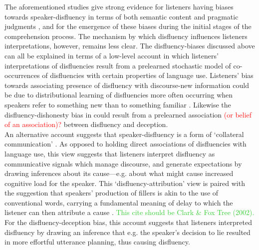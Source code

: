 \documentclass[man]{apa6}
\newcommand\thenote[1]{\textcolor{LimeGreen}{#1}}
\begin{document}
The aforementioned studies give strong evidence for listeners having biases towards speaker-disfluency in terms of both semantic content \citep{Arnold2004, Barr2001} and pragmatic judgments \citep{Loy2016}, and for the emergence of these biases during the initial stages of the comprehension process.
The mechanism by which disfluency influences listeners interpretations, however, remains less clear. 
The disfluency-biases discussed above can all be explained in terms of a low-level account in which listeners' interpretations of disfluencies result from a prelearned stochastic model of co-occurrences of disfluencies with certain properties of language use. 
Listeners' bias towards associating presence of disfluency with discourse-new information could be due to distributional learning of disfluencies more often occurring when speakers refer to something new than to something familiar \citep{Arnold2004, Barr2001}. 
Likewise the disfluency-dishonesty bias in \citet{Loy2016} could result from a prelearned association \textcolor{red}{(or belief of an association)?} between disfluency and deception.\\

An alternative account suggests that speaker-disfluency is a form of `collateral communication' \citep{Clark1996}. 
As opposed to holding direct associations of disfluencies with language use, this view suggests that listeners interpret disfluency as communicative signals which manage discourse, and generate expectations by drawing inferences about its cause---e.g. about what might cause increased cognitive load for the speaker. 
This `disfluency-attribution' view is paired with the suggestion that speakers' production of fillers is akin to the use of conventional words, carrying a fundamental meaning of delay to which the listener can then attribute a cause \citep{Clark2002}. \thenote{This cite should be Clark \& Fox Tree (2002).} 
For the disfluency-deception bias, this account suggests that listeners interpreted disfluency by drawing an inference that e.g. the speaker's decision to lie resulted in more effortful utterance planning, thus causing disfluency.\\
\end{document}
